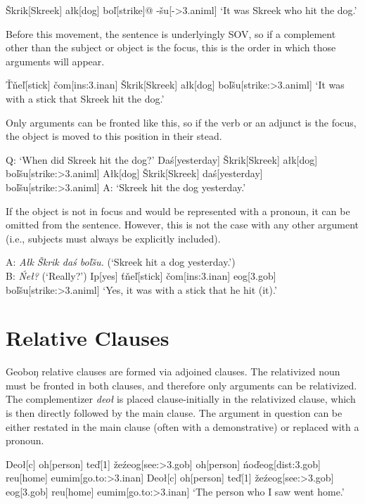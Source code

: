 \documentclass[a4paper,11pt,oneside,openany]{memoir}
\newcommand{\vt}{ť}
\newcommand{\vd}{ď}
\newcommand{\vc}{č}
\newcommand{\vz}{ž}
\newcommand{\vs}{š}
\newcommand{\vl}{ľ}
\newcommand{\vn}{ň}
\newcommand{\vT}{Ť}
\newcommand{\vS}{Š}
\newcommand{\engma}{ŋ}
\begin{document}
\ex
\begingl
\vS krik[Skreek]
a\l k[dog]
bo\vl[strike]@
-\vs u[-{\sc >3.animl}]
\glft `It was Skreek who hit the dog.'
\endgl
\xe

Before this movement, the sentence is underlyingly SOV, so if a complement other than the subject or object is the focus, this is the order in which those arguments will appear.

\ex
\begingl
\vT\vn e{\vl}[stick]
\vc om[\sc ins:3.inan]
\vS krik[Skreek]
a\l k[dog]
bo\vl\vs u[strike:{\sc >3.animl}]
\glft `It was with a stick that Skreek hit the dog.'
\endgl
\xe

Only arguments can be fronted like this, so if the verb or an adjunct is the focus, the object is moved to this position in their stead. 

\pex Q: `When did Skreek hit the dog?'
\a \ljudge*
\begingl
Da\'s[yesterday]
\vS krik[Skreek]
a\l k[dog]
bo\vl\vs u[strike:{\sc >3.animl}]
\endgl
\a 
\begingl
A\l k[dog]
\vS krik[Skreek] 
da\'s[yesterday]
bo\vl\vs u[strike:{\sc >3.animl}]
\glft A: `Skreek hit the dog yesterday.'
\endgl
\xe

If the object is not in focus and would be represented with a pronoun, it can be omitted from the sentence. However, this is not the case with any other argument (i.e., subjects must always be explicitly included).

\ex
\begingl
\glpreamble A: \textit{A\l k \vS krik da\'s bo\vl\vs u.} (`Skreek hit a dog yesterday.')\\B: \textit{\'Ne\l?} (`Really?')\endpreamble
Ip[yes]
\vt\vn e{\vl}[stick]
\vc om[\sc ins:3.inan]
eog[{\sc 3.gob}]
bo\vl\vs u[strike:{\sc >3.animl}]
\glft `Yes, it was with a stick that he hit (it).'
\endgl
\xe

\section{Relative Clauses}

Geobo{\engma} relative clauses are formed via adjoined clauses. The relativized noun must be fronted in both clauses, and therefore only arguments can be relativized. The complementizer \textit{deo\l} is placed clause-initially in the relativized clause, which is then directly followed by the main clause. The argument in question can be either restated in the main clause (often with a demonstrative) or replaced with a pronoun.

\pex
\a
\begingl
Deo{\l}[{\sc c}]
oh[person]
te{\vd}[1]
\vz e\'zeog[see:{\sc >3.gob}]
\nogloss{,}
oh[person]
\'no\vd eog[{\sc dist:3.gob}]
reu[home]
eumim[go.to:{\sc >3.inan}]
\endgl
\a
\begingl
Deo{\l}[{\sc c}]
oh[person]
te{\vd}[1]
\vz e\'zeog[see:{\sc >3.gob}]
eog[{\sc 3.gob}]
reu[home]
eumim[go.to:{\sc >3.inan}]
\glft `The person who I saw went home.'
\endgl
\xe
\end{document}

